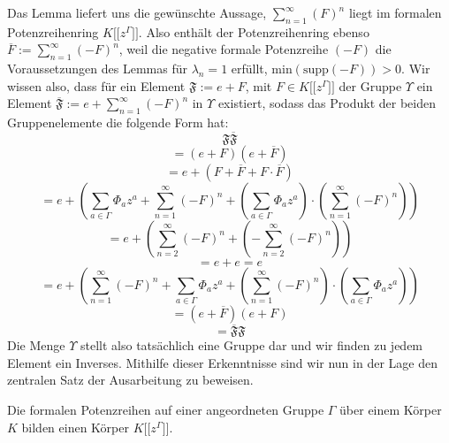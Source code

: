 Das Lemma liefert uns die gewünschte Aussage, $ \sum_{n=1}^{\infty}(F)^n$ liegt im formalen Potenzreihenring $K\lbrack\lbrack z^\Gamma\rbrack\rbrack$. Also enthält der Potenzreihenring ebenso $\overline{F} := \sum_{n=1}^{\infty}(-F)^n $, weil die negative formale Potenzreihe $\left(-F\right)$ die Voraussetzungen des Lemmas für $\lambda_n = 1$ erfüllt, $\text{min}\left(\text{supp}\left(-F\right)\right) > 0.$ 
Wir wissen also, dass für ein Element $\mathfrak{F} := e + F$, mit $F \in K\lbrack\lbrack z^\Gamma\rbrack\rbrack$ der Gruppe $\Upsilon$ ein Element $\overline{\mathfrak{F}} := e +\sum_{n=1}^{\infty}(-F)^n $ in $\Upsilon$ existiert, sodass das Produkt der beiden Gruppenelemente die folgende Form hat:
\[\mathfrak{F} \overline{\mathfrak{F}} \]
\[= \left(e  + F\right) \left(e + \overline{F}\right)\]
\[ = e + \left(F + \overline{F} + F\cdot\overline{F}\right) \]
\[= e + \left(\sum_{a \in \Gamma}\Phi_a z^a + \sum_{n=1}^{\infty}(-F)^n + \left(\sum_{a \in \Gamma}\Phi_a z^a\right)\cdot \left(\sum_{n=1}^{\infty}(-F)^n\right)\right)\]
\[ = e + \left( \sum_{n=2}^{\infty}(-F)^n + \left( - \sum_{n=2}^{\infty}(-F)^{n}\right)\right)\]
\[= e + e = e\]
\[ = e + \left(\sum_{n=1}^{\infty}(-F)^n + \sum_{a \in \Gamma}\Phi_a z^a + \left(\sum_{n=1}^{\infty}(-F)^n\right)\cdot \left(\sum_{a \in \Gamma}\Phi_a z^a\right)\right)\]
\[ =  \left(e  + \overline{F}\right) \left(e + F\right)\]
\[ = \mathfrak{\overline{F}}\mathfrak{F}\]
Die Menge $\Upsilon$ stellt also tatsächlich eine Gruppe dar und wir finden zu jedem Element ein Inverses. Mithilfe dieser Erkenntnisse sind wir nun in der Lage den zentralen Satz der Ausarbeitung zu beweisen.
\newpage
\begin{satz}
Die formalen Potenzreihen auf einer angeordneten Gruppe $\Gamma$ über einem Körper $K$ bilden einen Körper $K\lbrack\lbrack z^\Gamma\rbrack\rbrack$.
\end{satz}
